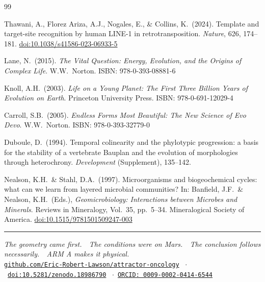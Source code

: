 \documentclass[11pt, a4paper]{article}
\begin{document}
\begin{thebibliography}{99}

Thawani, A., Florez Ariza, A.J.,
Nogales, E., \& Collins, K.\ (2024).
Template and target-site recognition by
human LINE-1 in retrotransposition.
\textit{Nature}, 626, 174--181.
\href{https://doi.org/10.1038/s41586-023-06933-5}
{doi:10.1038/s41586-023-06933-5}


Lane, N.\ (2015).
\textit{The Vital Question: Energy, Evolution,
and the Origins of Complex Life}.
W.W.\ Norton.
ISBN: 978-0-393-08881-6


Knoll, A.H.\ (2003).
\textit{Life on a Young Planet: The First Three
Billion Years of Evolution on Earth}.
Princeton University Press.
ISBN: 978-0-691-12029-4


Carroll, S.B.\ (2005).
\textit{Endless Forms Most Beautiful:
The New Science of Evo Devo}.
W.W.\ Norton.
ISBN: 978-0-393-32779-0


Duboule, D.\ (1994).
Temporal colinearity and the phylotypic
progression: a basis for the stability
of a vertebrate Bauplan and the evolution
of morphologies through heterochrony.
\textit{Development} (Supplement),
135--142.


Nealson, K.H.\ \& Stahl, D.A.\ (1997).
Microorganisms and biogeochemical cycles:
what can we learn from layered microbial
communities?
In: Banfield, J.F.\ \& Nealson, K.H.\ (Eds.),
\textit{Geomicrobiology: Interactions between
Microbes and Minerals}.
Reviews in Mineralogy, Vol.\ 35, pp.\ 5--34.
Mineralogical Society of America.
\href{https://doi.org/10.1515/9781501509247-003}
{doi:10.1515/9781501509247-003}

\end{thebibliography}

\vspace{1em}
\noindent\textcolor{rulecolor}{\rule{\linewidth}{0.4pt}}
\begin{center}
\footnotesize
\textit{The geometry came first.\ \
The conditions were on Mars.\ \
The conclusion follows necessarily.\ \
ARM A makes it physical.}\\[0.3em]
\href{https://github.com/Eric-Robert-Lawson/attractor-oncology}
{\texttt{github.com/Eric-Robert-Lawson/attractor-oncology}}
\ $\cdot$\
\href{https://doi.org/10.5281/zenodo.18986790}
{\texttt{doi:10.5281/zenodo.18986790}}
\ $\cdot$\
\href{https://orcid.org/0009-0002-0414-6544}
{\texttt{ORCID: 0009-0002-0414-6544}}
\end{center}
\end{document}
